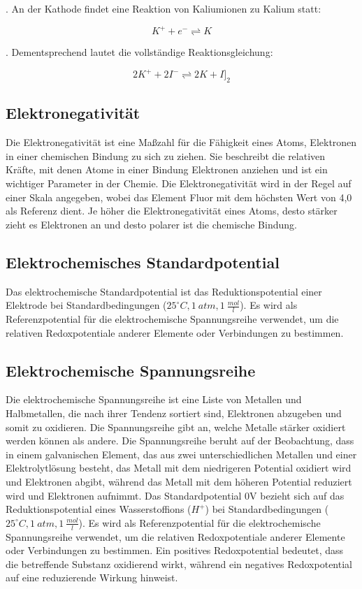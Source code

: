 \documentclass[11pt]{article}
\begin{document}
. An der Kathode findet eine Reaktion von Kaliumionen zu Kalium statt:
\begin{center}
    \begin{equation}
        K^{+} + e^{-} \rightleftharpoons K
    \end{equation}
\end{center}
. Dementsprechend lautet die vollständige Reaktionsgleichung:
\begin{center}
    \begin{equation}
        2 K^{+} + 2 I^{-} \rightleftharpoons 2 K + I]_{2}
    \end{equation}
\end{center}

\subsection{Elektronegativität}
Die Elektronegativität ist eine Maßzahl für die Fähigkeit eines Atoms, Elektronen in einer chemischen Bindung zu sich zu ziehen. Sie beschreibt die relativen Kräfte, mit denen Atome in einer Bindung Elektronen anziehen und ist ein wichtiger Parameter in der Chemie. Die Elektronegativität wird in der Regel auf einer Skala angegeben, wobei das Element Fluor mit dem höchsten Wert von 4,0 als Referenz dient. Je höher die Elektronegativität eines Atoms, desto stärker zieht es Elektronen an und desto polarer ist die chemische Bindung.

\subsection{Elektrochemisches Standardpotential}
Das elektrochemische Standardpotential ist das Reduktionspotential einer Elektrode bei Standardbedingungen ($25^{\circ}C, 1 \:atm, 1 \:\frac{mol}{l}$). Es wird als Referenzpotential für die elektrochemische Spannungsreihe verwendet, um die relativen Redoxpotentiale anderer Elemente oder Verbindungen zu bestimmen.

\subsection{Elektrochemische Spannungsreihe}
Die elektrochemische Spannungsreihe ist eine Liste von Metallen und Halbmetallen, die nach ihrer Tendenz sortiert sind, Elektronen abzugeben und somit zu oxidieren. Die Spannungsreihe gibt an, welche Metalle stärker oxidiert werden können als andere. Die Spannungsreihe beruht auf der Beobachtung, dass in einem galvanischen Element, das aus zwei unterschiedlichen Metallen und einer Elektrolytlösung besteht, das Metall mit dem niedrigeren Potential oxidiert wird und Elektronen abgibt, während das Metall mit dem höheren Potential reduziert wird und Elektronen aufnimmt.
Das Standardpotential 0V bezieht sich auf das Reduktionspotential eines Wasserstoffions ($H^{+}$) bei Standardbedingungen ($25^{\circ}C, 1 \:atm, 1 \:\frac{mol}{l}$). Es wird als Referenzpotential für die elektrochemische Spannungsreihe verwendet, um die relativen Redoxpotentiale anderer Elemente oder Verbindungen zu bestimmen. Ein positives Redoxpotential bedeutet, dass die betreffende Substanz oxidierend wirkt, während ein negatives Redoxpotential auf eine reduzierende Wirkung hinweist.
\end{document}
